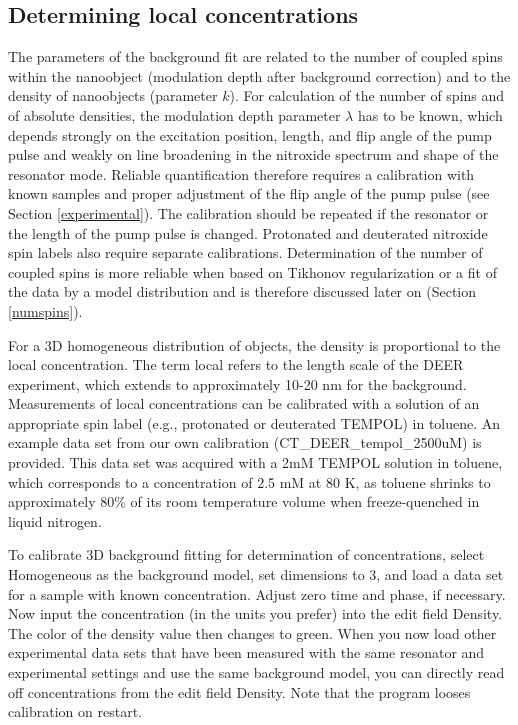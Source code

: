\documentclass{article}
\begin{document}
\subsection{Determining local concentrations}
\label{localconc}
The parameters of the background fit are related to the number of coupled spins
within the nanoobject (modulation depth after background correction) and to the density of nanoobjects (parameter $k$). For calculation of the number of spins and of absolute densities, the modulation depth parameter $\lambda$ has to be known, which depends strongly on the
excitation position, length, and flip angle of the pump pulse and weakly on line broadening in the nitroxide spectrum and shape of the resonator mode. Reliable
quantification therefore requires a calibration with known samples and proper
adjustment of the flip angle of the pump pulse (see Section \ref{experimental}). The calibration should
be repeated if the resonator or the length of the pump pulse is changed. Protonated
and deuterated nitroxide spin labels also require separate calibrations.
Determination of the number of coupled spins is more reliable when based on
Tikhonov regularization or a fit of the data by a model distribution and is therefore discussed later on (Section \ref{numspins}).

For a 3D homogeneous distribution of objects, the density is proportional to
the local concentration. The term local refers to the length scale of the DEER
experiment, which extends to approximately 10-20 nm for the background.
Measurements of local concentrations can be calibrated with a solution of an
appropriate spin label (e.g., protonated or deuterated TEMPOL) in toluene.
An example data set from our own calibration (CT\_DEER\_tempol\_2500uM) is
provided. This data set was acquired with a 2mM TEMPOL solution in toluene,
which corresponds to a concentration of 2.5 mM at 80 K, as toluene shrinks to
approximately 80\% of its room temperature volume when freeze-quenched in
liquid nitrogen.

To calibrate 3D background fitting for determination of concentrations, select
{\ttfamily Homogeneous} as the background model, set {\ttfamily dimensions} to 3, and load a data set for a sample with known concentration. Adjust zero time and phase, if necessary. Now input
the concentration (in the units you prefer) into the edit field {\ttfamily Density}. The color of the density value then changes to green. When you now load other experimental data sets that have
been measured with the same resonator and experimental settings and use the same background model, you can directly read off concentrations
from the edit field {\ttfamily Density}. Note that the program looses calibration on
restart.
\end{document}
